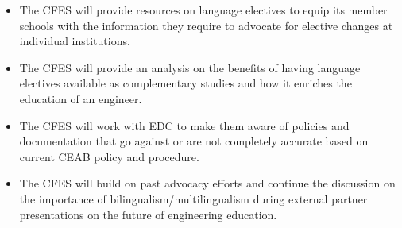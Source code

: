 \begin{itemize}
 \item The CFES will provide resources on language electives to equip its member schools with the information they require to advocate for elective changes at individual institutions.
 \item The CFES will provide an analysis on the benefits of having language electives available as complementary studies and how it enriches the education of an engineer.
 \item The CFES will work with EDC to make them aware of policies and documentation that go against or are not completely accurate based on current CEAB policy and procedure.
 \item The CFES will build on past advocacy efforts and continue the discussion on the importance of bilingualism/multilingualism during external partner presentations on the future of engineering education.
\end{itemize}

\newpage
